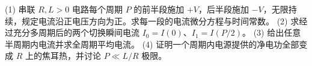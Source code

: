 (1) 串联 \(R,L>0\) 电路每个周期 \(P\) 的前半段施加 \(+V\)，后半段施加 \(-V\)，无限持续，规定电流沿正电压方向为正。求每一段的电流微分方程与时间常数。
(2) 求经过充分多周期后的两个切换瞬间电流 \(I_0=I(0)\)、\(I_1=I(P/2)\)。
(3) 给出任意半周期内电流并求全周期平均电流。
(4) 证明一个周期内电源提供的净电功全部变成 \(R\) 上的焦耳热，并讨论 \(P\ll L/R\) 极限。

